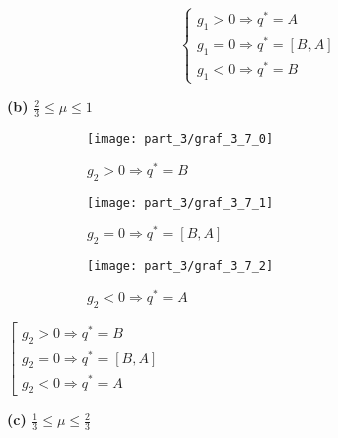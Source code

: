 	
	$$
		\begin{cases}
			g_1 > 0 \Rightarrow q^*=A \\
			g_1 = 0 \Rightarrow q^*=[B,A] \\
			g_1 < 0 \Rightarrow q^*=B
		\end{cases}
	$$	
	
	\textbf{(b)} $\frac{2}{3} \leqslant \mu \leqslant 1$
			
	\begin{figure}[H]
    	\centering
     	\begin{subfigure}[b]{0.3 \textwidth}
        	\centering
        	\texttt{[image: part\_3/graf\_3\_7\_0]}
        	\caption{$g_2 > 0 \Rightarrow q^*=B$}
         	\label{fig:y equals x}
     	\end{subfigure}
     	\begin{subfigure}[b]{0.3 \textwidth}
        	\centering
        	\texttt{[image: part\_3/graf\_3\_7\_1]}
        	\caption{$g_2 = 0 \Rightarrow q^*=[B,A]$}
        	\label{fig:three sin x}
     	\end{subfigure}
     	\begin{subfigure}[b]{0.3 \textwidth}
        	\centering
        	\texttt{[image: part\_3/graf\_3\_7\_2]}
        	\caption{$g_2 < 0 \Rightarrow q^*=A$}
        	\label{fig:three sin x}
     	\end{subfigure}
     	\caption{}
	\end{figure}
	
	\begin{center}
		$\left[
		\begin{gathered}
			g_2 > 0 \Rightarrow q^*=B \\
			g_2 = 0 \Rightarrow q^*=[B,A] \\
			g_2 < 0 \Rightarrow q^*=A
		\end{gathered}
		\right.$	
	\end{center}	
	
	\newpage

	\textbf{(c)} $\frac{1}{3} \leqslant \mu \leqslant \frac{2}{3}$
	
